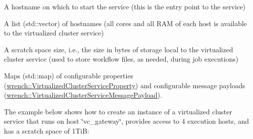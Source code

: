 \begin{DoxyItemize}
\item A hostname on which to start the service (this is the entry point to the service)
\item A list ({\ttfamily std\+::vector}) of hostnames (all cores and all R\+AM of each host is available to the virtualized cluster service)
\item A scratch space size, i.\+e., the size in bytes of storage local to the virtualized cluster service (used to store workflow files, as needed, during job executions)
\item Maps ({\ttfamily std\+::map}) of configurable properties ({\ttfamily \hyperlink{classwrench_1_1_virtualized_cluster_service_property}{wrench\+::\+Virtualized\+Cluster\+Service\+Property}}) and configurable message payloads ({\ttfamily \hyperlink{classwrench_1_1_virtualized_cluster_service_message_payload}{wrench\+::\+Virtualized\+Cluster\+Service\+Message\+Payload}}).
\end{DoxyItemize}

The example below shows how to create an instance of a virtualized cluster service that runs on host \char`\"{}vc\+\_\+gateway\char`\"{}, provides access to 4 execution hosts, and has a scratch space of 1\+TiB\+:


